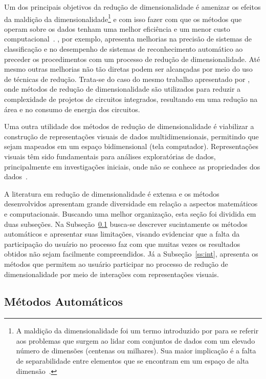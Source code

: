 Um dos principais objetivos da redução de dimensionalidade é
amenizar os efeitos da maldição da
dimensionalidade\footnote{A maldição da dimensionalidade foi
    um termo introduzido por \citet{Bellman1961} para se
    referir aos problemas que surgem ao lidar com conjuntos
    de dados com um elevado número de dimensões (centenas ou
    milhares). Sua maior implicação é a falta de
separabilidade entre elementos que se encontram em um espaço
de alta dimensão~\cite{Kouiroukidis2011}.} e com isso fazer
com que os métodos que operam sobre os dados tenham uma
melhor eficiência e um menor custo
computacional~\cite{Maaten2009}.  \citet{Konig2000}, por
exemplo, apresenta melhorias na precisão de sistemas de
classificação e no desempenho de sistemas de reconhecimento
automático ao preceder os procedimentos com um processo de
redução de dimensionalidade. Até mesmo outras melhorias não
tão diretas podem ser alcançadas por meio do uso de técnicas
de redução.  Trata-se do caso do mesmo trabalho apresentado
por \citeauthor{Konig2000}, onde métodos de redução de
dimensionalidade são utilizados para reduzir a complexidade
de projetos de circuitos integrados, resultando em uma
redução na área e no consumo de energia dos circuitos. 

Uma outra utilidade dos métodos de redução de
dimensionalidade é viabilizar a construção de representações
visuais de dados multidimensionais, permitindo que sejam
mapeados em um espaço bidimensional (tela computador).
Representações visuais têm sido fundamentais para análises
exploratórias de dados, principalmente em investigações
iniciais, onde não
se conhece as propriedades dos dados~\cite{Kaski2011}. 

A literatura em redução de dimensionalidade é extensa e os
métodos desenvolvidos apresentam grande diversidade em
relação a aspectos matemáticos e computacionais. Buscando
uma melhor organização, esta seção foi dividida em duas
subseções. Na Subseção~\ref{ss:auto} busca-se descrever
sucintamente os métodos automáticos e apresentar suas
limitações, visando evidenciar que a falta da participação
do usuário no processo faz com que muitas vezes os
resultados obtidos não sejam facilmente compreendidos. Já a
Subseção~\ref{ss:int}, apresenta os métodos que permitem ao
usuário participar no processo de redução de
dimensionalidade por meio de interações com representações
visuais. 

\subsection{Métodos Automáticos}\label{ss:auto}

